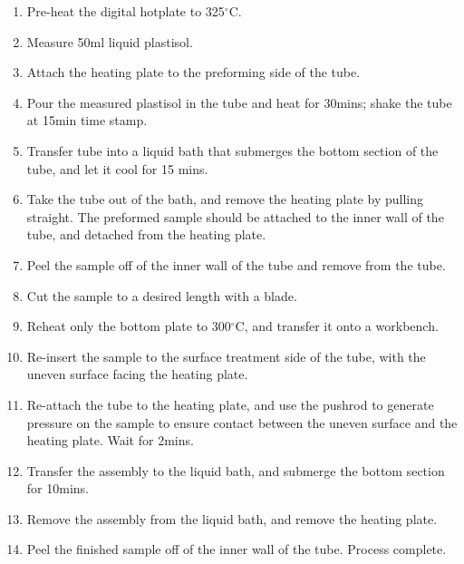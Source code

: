 \begin{enumerate}
\item Pre-heat the digital hotplate to 325$^\circ$C.
\item Measure 50ml liquid plastisol.
\item Attach the heating plate to the preforming side of the tube.
\item Pour the measured plastisol in the tube and heat for 30mins; shake the tube at 15min time stamp.
\item Transfer tube into a liquid bath that submerges the bottom section of the tube, and let it cool for 15 mins.
\item Take the tube out of the bath, and remove the heating plate by pulling straight. The preformed sample should be attached to the inner wall of the tube, and detached from the heating plate.
\item Peel the sample off of the inner wall of the tube and remove from the tube.
\item Cut the sample to a desired length with a blade. 
\item Reheat only the bottom plate to 300$^\circ$C, and transfer it onto a workbench.
\item Re-insert the sample to the surface treatment side of the tube, with the uneven surface facing the heating plate. 
\item Re-attach the tube to the heating plate, and use the pushrod to generate pressure on the sample to ensure contact between the uneven surface and the heating plate. Wait for 2mins.
\item Transfer the assembly to the liquid bath, and submerge the bottom section for 10mins.
\item Remove the assembly from the liquid bath, and remove the heating plate.
\item Peel the finished sample off of the inner wall of the tube. Process complete.
\end{enumerate}

